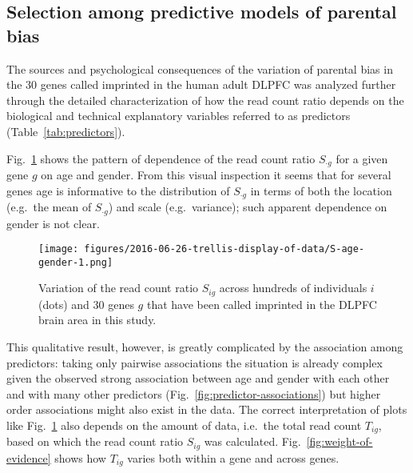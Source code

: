\documentclass[letterpaper]{article}
\begin{document}
\subsection{Selection among predictive models of parental bias}
\label{sec:results-regression}

The sources and psychological consequences of the variation of parental bias
in the 30 genes called imprinted in the human adult DLPFC was analyzed further through the detailed
characterization of how the read count ratio depends on the biological and
technical explanatory variables referred to as predictors
(Table~\ref{tab:predictors}).

Fig.~\ref{fig:S-age-gender} shows the pattern of dependence of
the read count ratio \(S_{\cdot g}\) for a given gene \(g\) on age and gender.  From
this visual inspection it seems that for several genes age is informative to
the distribution of \(S_{\cdot g}\) in terms of both the location (e.g.~the mean of
\(S_{\cdot g}\)) and scale (e.g.~variance); such apparent dependence on gender is not
clear.

\begin{figure}
\begin{center}
\texttt{[image: figures/2016-06-26-trellis-display-of-data/S-age-gender-1.png]}
\caption{
Variation of the read count ratio \(S_{ig}\) across hundreds of individuals
\(i\) (dots) and 30 genes \(g\) that have been called imprinted in the DLPFC
brain area in this study.
}
\label{fig:S-age-gender}
\end{center}
\end{figure}

This qualitative result, however, is greatly complicated by the association
among predictors: taking only pairwise associations the situation is already
complex given the observed strong association between age and gender with each
other and with many other predictors (Fig.~\ref{fig:predictor-associations})
but higher order associations might also exist in the data.
The correct interpretation of plots like Fig.~\ref{fig:S-age-gender} also depends on
the amount of data, i.e.~the total read count \(T_{ig}\), based on which the
read count ratio \(S_{ig}\) was calculated.  Fig.~\ref{fig:weight-of-evidence}
shows how \(T_{ig}\) varies both within a gene and across genes.
\end{document}
